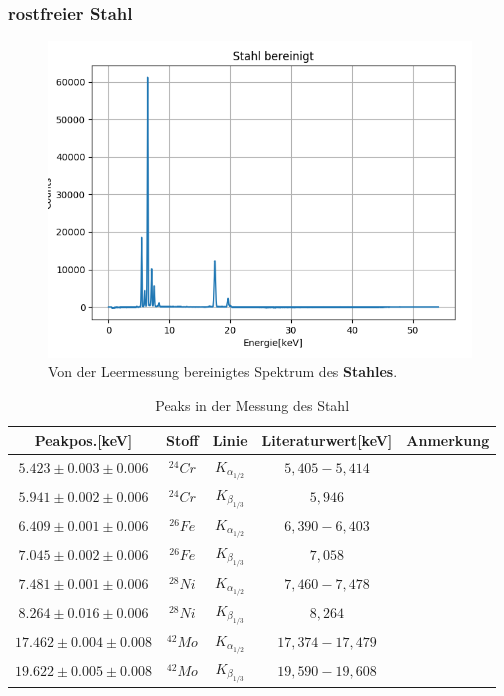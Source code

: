 \documentclass[12pt,a4paper]{article}
\begin{document}
\newpage
\subsubsection{rostfreier Stahl}
\begin{figure}[H]
\centering
\includegraphics[scale=1]{Bilder/roentgen_spektren/stahl_0.png}
\caption{Von der Leermessung bereinigtes Spektrum des \textbf{Stahles}.}
\label{fig:prop_stahl}
\end{figure}

\begin{table}[H]
\center
\begin{tabular}{|c|c|c|c|c|}
\hline 
Peakpos.[keV] & Stoff & Linie & Literaturwert[keV] & Anmerkung \\
\hline 
$5.423 \pm 0.003 \pm 0.006$& $^{24}Cr$ & $K_{\alpha_{1/2}}$ & $5,405-5,414$ & \\
\hline 
$5.941 \pm 0.002 \pm 0.006$ & $^{24}Cr$ & $K_{\beta_{1/3}}$ & $5,946$ & \\
\hline 
$6.409 \pm 0.001 \pm 0.006$ & $^{26}Fe$ & $K_{\alpha_{1/2}}$ & $6,390-6,403$ & \\
\hline
$7.045 \pm 0.002 \pm 0.006$ & $^{26}Fe$ & $K_{\beta_{1/3}}$ & $7,058$ & \\
\hline
$7.481 \pm 0.001 \pm 0.006$ & $^{28}Ni$ & $K_{\alpha_{1/2}}$ & $7,460-7,478$ & \\
\hline
$8.264 \pm 0.016 \pm 0.006$ & $^{28}Ni$ & $K_{\beta_{1/3}}$ & $8,264$ & \\
\hline
$17.462 \pm 0.004 \pm 0.008$ & $^{42}Mo$ & $K_{\alpha_{1/2}}$ & $17,374-17,479$ & \\
\hline
$19.622 \pm 0.005 \pm 0.008$ & $^{42}Mo$ & $K_{\beta_{1/3}}$ & $19,590-19,608$ & \\
\hline
\end{tabular} 
\caption{Peaks in der Messung des Stahl}
\label{prob_stahl}
\end{table}
\end{document}
